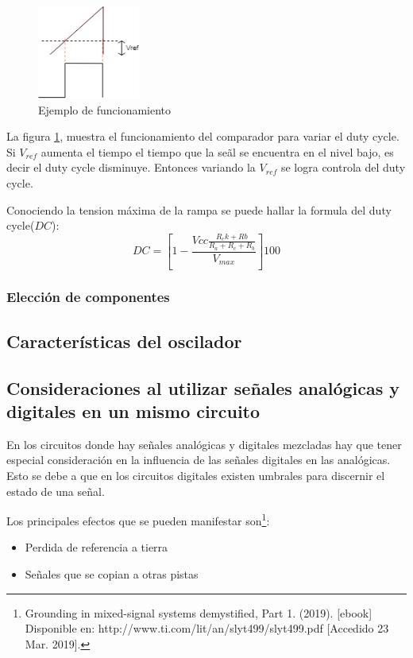 \documentclass[../../ASSD_TP1_G7.tex]{subfiles}
\begin{document}
\begin{figure}[H]
\centering
\includegraphics[width=0.3\textwidth]{figures/r2sq.png}
\caption{Ejemplo de funcionamiento}\label{fig:ej}
\end{figure}

La figura \ref{fig:ej}, muestra el funcionamiento del comparador para variar el duty cycle. Si $V_{ref}$ aumenta el tiempo el tiempo que la se\~al se encuentra en el nivel bajo, es decir el duty cycle disminuye. Entonces variando la $V_{ref}$ se logra controla del duty cycle. 
\par Conociendo la tension máxima de la rampa se puede hallar la formula del duty cycle($DC$):
\begin{equation}
DC=\left[ 1 - \frac{Vcc \frac{R_ck + Rb}{R_a + R_c + R_b}}{V_{max}} \right] 100
\end{equation}

\subsubsection*{Elección de componentes}


\subsection*{Características del oscilador}
\subsection*{Consideraciones al utilizar se\~nales analógicas y digitales en un mismo circuito }
\par En los circuitos donde hay se\~nales analógicas y digitales mezcladas hay que tener especial consideración en la influencia de las se\~nales digitales en las analógicas. Esto se debe a que en los circuitos digitales existen umbrales para discernir el estado de una se\~nal. 
\par Los principales efectos que se pueden manifestar son\footnote{Grounding in mixed-signal systems demystified, Part 1. (2019). [ebook] Disponible en: http://www.ti.com/lit/an/slyt499/slyt499.pdf [Accedido 23 Mar. 2019].}:
\begin{itemize}
  \item Perdida de referencia a tierra 
  \item Se\~nales que se copian a otras pistas 

\end{itemize}
\end{document}
